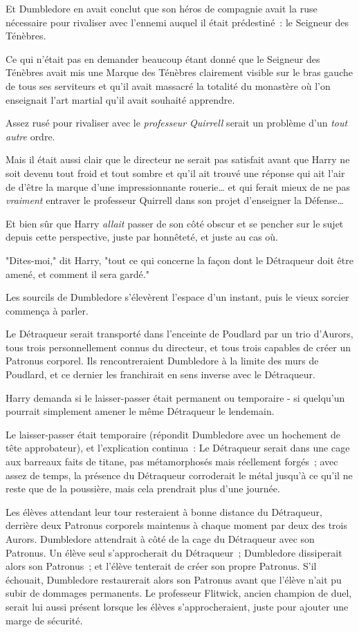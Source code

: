 Et Dumbledore en avait conclut que son héros de compagnie avait la ruse nécessaire pour rivaliser avec l'ennemi auquel il était prédestiné~: le Seigneur des Ténèbres.

Ce qui n'était pas en demander beaucoup étant donné que le Seigneur des Ténèbres avait mis une Marque des Ténèbres clairement visible sur le bras gauche de tous ses serviteurs et qu'il avait massacré la totalité du monastère où l'on enseignait l'art martial qu'il avait souhaité apprendre.

Assez rusé pour rivaliser avec le \emph{professeur Quirrell} serait un problème d'un \emph{tout} \emph{autre} ordre.

Mais il était aussi clair que le directeur ne serait pas satisfait avant que Harry ne soit devenu tout froid et tout sombre et qu'il ait trouvé une réponse qui ait l'air de d'être la marque d'une impressionnante rouerie… et qui ferait mieux de ne pas \emph{vraiment} entraver le professeur Quirrell dans son projet d'enseigner la Défense…

Et bien sûr que Harry \emph{allait} passer de son côté obscur et se pencher sur le sujet depuis cette perspective, juste par honnêteté, et juste au cas où.

"Dites-moi," dit Harry, "tout ce qui concerne la façon dont le Détraqueur doit être amené, et comment il sera gardé."

Les sourcils de Dumbledore s'élevèrent l'espace d'un instant, puis le vieux sorcier commença à parler.

Le Détraqueur serait transporté dans l'enceinte de Poudlard par un trio d'Aurors, tous trois personnellement connus du directeur, et tous trois capables de créer un Patronus corporel. Ils rencontreraient Dumbledore à la limite des murs de Poudlard, et ce dernier les franchirait en sens inverse avec le Détraqueur.

Harry demanda si le laisser-passer était permanent ou temporaire - si quelqu'un pourrait simplement amener le même Détraqueur le lendemain.

Le laisser-passer était temporaire (répondit Dumbledore avec un hochement de tête approbateur), et l'explication continua~: Le Détraqueur serait dans une cage aux barreaux faits de titane, pas métamorphosés mais réellement forgés~; avec assez de temps, la présence du Détraqueur corroderait le métal jusqu'à ce qu'il ne reste que de la poussière, mais cela prendrait plus d'une journée.

Les élèves attendant leur tour resteraient à bonne distance du Détraqueur, derrière deux Patronus corporels maintenus à chaque moment par deux des trois Aurors. Dumbledore attendrait à côté de la cage du Détraqueur avec son Patronus. Un élève seul s'approcherait du Détraqueur~; Dumbledore dissiperait alors son Patronus~; et l'élève tenterait de créer son propre Patronus. S'il échouait, Dumbledore restaurerait alors son Patronus avant que l'élève n'ait pu subir de dommages permanents. Le professeur Flitwick, ancien champion de duel, serait lui aussi présent lorsque les élèves s'approcheraient, juste pour ajouter une marge de sécurité.

